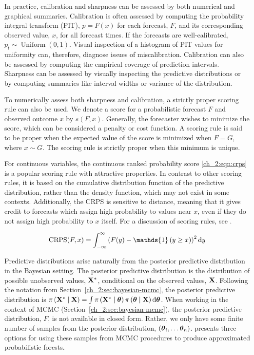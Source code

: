 In practice, calibration and sharpness can be assessed by both numerical and graphical summaries.
Calibration is often assessed by computing the probability integral transform (PIT), \( p = F(x) \) for each forecast, \( F \), and its corresponding observed value, \( x \), for all forecast times.
If the forecasts are well-calibrated, \( p_t \sim \operatorname{Uniform}(0,1) \).
Visual inspection of a histogram of PIT values for uniformity can, therefore, diagnose issues of miscalibration.
Calibration can also be assessed by computing the empirical coverage of prediction intervals.
Sharpness can be assessed by visually inspecting the predictive distributions or by computing summaries like interval widths or variance of the distribution.

To numerically assess both sharpness and calibration, a strictly proper scoring rule can also be used.
We denote a score for a probabilistic forecast \( F \) and observed outcome \( x \) by \( s(F, x) \).
Generally, the forecaster wishes to minimize the score, which can be considered a penalty or cost function.
A scoring rule is said to be proper when the expected value of the score is minimized when \( F = G \), where $x \sim G$.
The scoring rule is strictly proper when this minimum is unique.

For continuous variables, the continuous ranked probability score \eqref{ch_2:eqn:crps} is a popular scoring rule with attractive properties.
In contrast to other scoring rules, it is based on the cumulative distribution function of the predictive distribution, rather than the density function, which may not exist in some contexts.
Additionally, the CRPS is sensitive to distance, meaning that it gives credit to forecasts which assign high probability to values near \( x \), even if they do not assign high probability to \( x \) itself.
For a discussion of scoring rules, see \citet{gneiting2007strictly}.

\begin{equation}
    \operatorname{CRPS}(F, x) = \int_{-\infty}^{\infty} \left( F(y) - \mathds{1} \left( y \geq x \right) \right)^2 \rmd y
    \label{ch_2:eqn:crps}
\end{equation}

Predictive distributions arise naturally from the posterior predictive distribution in the Bayesian setting.
The posterior predictive distribution is the distribution of possible unobserved values, \( \mathbf{X}^* \), conditional on the observed values, \( \mathbf{X} \).
Following the notation from Section~\ref{ch_2:sec:bayesian-mcmc}, the posterior predictive distribution is \( \pi \left( \mathbf{X}^* \mid \mathbf{X} \right) = \int \pi \left( \mathbf{X}^* \mid \boldsymbol{\theta} \right) \pi \left( \boldsymbol{\theta} \mid \mathbf{X} \right) \mathrm{d} \boldsymbol{\theta} \).
When working in the context of MCMC (Section~\ref{ch_2:sec:bayesian-mcmc}), the posterior predictive distribution, \( F \), is not available in closed form.
Rather, we only have some finite number of samples from the posterior distribution, \( \left( \boldsymbol{\theta}_i, \ldots \boldsymbol{\theta}_n \right) \).
\citet{kruger2021predictive} presents three options for using these samples from MCMC procedures to produce approximated probabilistic forests.

